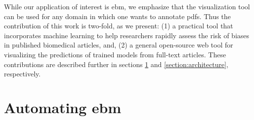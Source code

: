 \documentclass[runningheads,a4paper]{llncs}
\begin{document}
While our application of interest is \ac{ebm}, we emphasize that the visualization tool can be used for any domain in which one wants to annotate \acp{pdf}.
Thus the contribution of this work is two-fold, as we present:
(1) a practical tool that incorporates machine learning to help researchers rapidly assess the risk of biases in published biomedical articles, and,
(2) a general open-source web tool for visualizing the predictions of trained models from full-text articles.
These contributions are described further in sections \ref{section:EBM-ML} and \ref{section:architecture}, respectively.

\section{Automating \acl{ebm}}
\label{section:EBM-ML}


\end{document}
